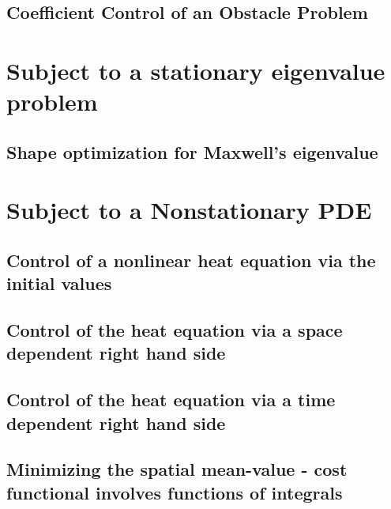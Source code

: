 \documentclass[a4paper,cleardoubleempty]{scrreprt}
\theoremstyle{plain}
\theoremstyle{remark}
\begin{document}
\subsection{Coefficient Control of an Obstacle Problem}
\label{OPT_Stat_Obstacle_CoefficientControl}

\section{Subject to a stationary eigenvalue problem}
\label{OPT_eigenvalue}
\subsection{Shape optimization for Maxwell's eigenvalue}
\label{OPT_eigenvalue1}

\clearpage
\section{Subject to a Nonstationary PDE}
\label{OPT_Instat}
\subsection{Control of a nonlinear heat equation via the initial values}
\label{OPT_Instat initial-value end-time}

\clearpage
\subsection{Control of the heat equation via a space dependent right hand side}
\label{OPT_Instat stationary control}

\clearpage
\subsection{Control of the heat equation via a time dependent right hand side}
\label{OPT_Instat nonstationary control}

\clearpage
\subsection{Minimizing the spatial mean-value - cost functional involves functions of integrals}
\label{OPT_Instat initial-value extension}

\clearpage














\printindex

\end{document}
